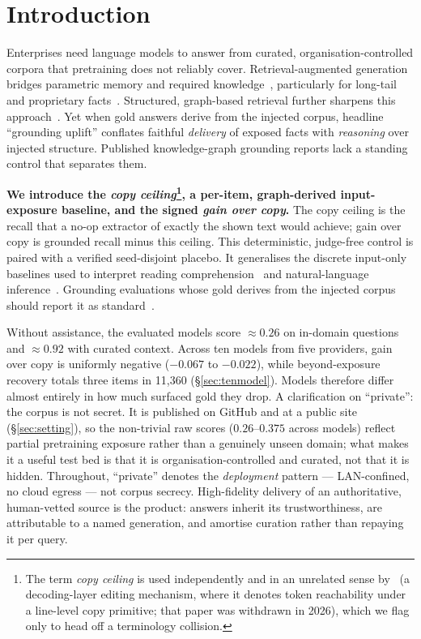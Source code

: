\documentclass[10pt,twocolumn]{article}
\begin{document}
\section{Introduction}\label{sec:intro}
Enterprises need language models to answer from curated, organisation-controlled corpora that pretraining does not reliably cover. Retrieval-augmented generation bridges parametric memory and required knowledge~\cite{lewis2020rag,gao2023ragsurvey}, particularly for long-tail and proprietary facts~\cite{mallen2023trust}. Structured, graph-based retrieval further sharpens this approach~\cite{edge2024graphrag,guo2024lightrag,baek2023kaping,pan2024unifying}. Yet when gold answers derive from the injected corpus, headline ``grounding uplift'' conflates faithful \emph{delivery} of exposed facts with \emph{reasoning} over injected structure. Published knowledge-graph grounding reports lack a standing control that separates them.

\textbf{We introduce the \emph{copy ceiling}\footnote{The term \emph{copy ceiling} is used independently and in an unrelated sense by~\textcite{copyasdecode2026} (a decoding-layer editing mechanism, where it denotes token reachability under a line-level copy primitive; that paper was withdrawn in 2026), which we flag only to head off a terminology collision.}, a per-item, graph-derived input-exposure baseline, and the signed \emph{gain over copy}.} The copy ceiling is the recall that a no-op extractor of exactly the shown text would achieve; gain over copy is grounded recall minus this ceiling. This deterministic, judge-free control is paired with a verified seed-disjoint placebo. It generalises the discrete input-only baselines used to interpret reading comprehension~\cite{kaushik2018reading} and natural-language inference~\cite{gururangan2018artifacts,poliak2018hypothesis}. Grounding evaluations whose gold derives from the injected corpus should report it as standard~\cite{laitenberger2025stronger,min2023factscore}.

Without assistance, the evaluated models score $\approx0.26$ on in-domain questions and $\approx0.92$ with curated context. Across ten models from five providers, gain over copy is uniformly negative ($-0.067$ to $-0.022$), while beyond-exposure recovery totals three items in 11{,}360 (\S\ref{sec:tenmodel}). Models therefore differ almost entirely in how much surfaced gold they drop. A clarification on ``private'': the corpus is not secret. It is published on GitHub and at a public site (\S\ref{sec:setting}), so the non-trivial raw scores ($0.26$--$0.375$ across models) reflect partial pretraining exposure rather than a genuinely unseen domain; what makes it a useful test bed is that it is organisation-controlled and curated, not that it is hidden. Throughout, ``private'' denotes the \emph{deployment} pattern --- LAN-confined, no cloud egress --- not corpus secrecy. High-fidelity delivery of an authoritative, human-vetted source is the product: answers inherit its trustworthiness, are attributable to a named generation, and amortise curation rather than repaying it per query.
\end{document}
